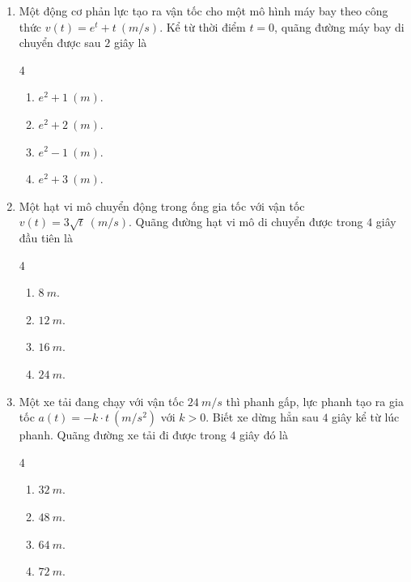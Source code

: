 \documentclass[12pt]{article}
\begin{document}
\begin{enumerate}[label=\textbf{Câu \arabic*.}]
		\item Một động cơ phản lực tạo ra vận tốc cho một mô hình máy bay theo công thức $v(t) = e^t + t \ (m/s)$. Kể từ thời điểm $t = 0$, quãng đường máy bay di chuyển được sau $2$ giây là
		\begin{multicols}{4}
			\begin{enumerate}[label=\textbf{\Alph*.}]
				\item $e^2 + 1 \ (m)$.
				\item $e^2 + 2 \ (m)$.
				\item $e^2 - 1 \ (m)$.
				\item $e^2 + 3 \ (m)$.
			\end{enumerate}
		\end{multicols}
		
		\item Một hạt vi mô chuyển động trong ống gia tốc với vận tốc $v(t) = 3\sqrt{t} \ (m/s)$. Quãng đường hạt vi mô di chuyển được trong $4$ giây đầu tiên là
		\begin{multicols}{4}
			\begin{enumerate}[label=\textbf{\Alph*.}]
				\item $8 \ m$.
				\item $12 \ m$.
				\item $16 \ m$.
				\item $24 \ m$.
			\end{enumerate}
		\end{multicols}
		
		\item Một xe tải đang chạy với vận tốc $24 \ m/s$ thì phanh gấp, lực phanh tạo ra gia tốc $a(t) = -k \cdot t \ (m/s^2)$ với $k > 0$. Biết xe dừng hẳn sau $4$ giây kể từ lúc phanh. Quãng đường xe tải đi được trong $4$ giây đó là
		\begin{multicols}{4}
			\begin{enumerate}[label=\textbf{\Alph*.}]
				\item $32 \ m$.
				\item $48 \ m$.
				\item $64 \ m$.
				\item $72 \ m$.
			\end{enumerate}
		\end{multicols}
		

\end{enumerate}
\end{document}
